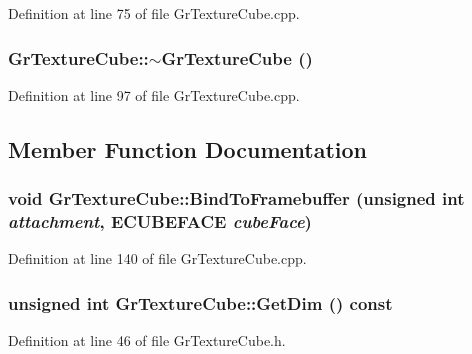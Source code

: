 \begin{CompactItemize}
Definition at line 75 of file GrTextureCube.cpp.\hypertarget{class_gr_texture_cube_db0024c06cac0f1e5cd6cbd6ba893e77}{
\subsubsection[{$\sim$GrTextureCube}]{\setlength{\rightskip}{0pt plus 5cm}GrTextureCube::$\sim$GrTextureCube ()}}
\label{class_gr_texture_cube_db0024c06cac0f1e5cd6cbd6ba893e77}




Definition at line 97 of file GrTextureCube.cpp.

\subsection{Member Function Documentation}
\hypertarget{class_gr_texture_cube_83627920cbb16d0bd7a2f9821c0125d1}{
\subsubsection[{BindToFramebuffer}]{\setlength{\rightskip}{0pt plus 5cm}void GrTextureCube::BindToFramebuffer (unsigned int {\em attachment}, \/  {\bf ECUBEFACE} {\em cubeFace})}}
\label{class_gr_texture_cube_83627920cbb16d0bd7a2f9821c0125d1}




Definition at line 140 of file GrTextureCube.cpp.\hypertarget{class_gr_texture_cube_8b80ffcf02983fb848a70e12d31c07fa}{
\subsubsection[{GetDim}]{\setlength{\rightskip}{0pt plus 5cm}unsigned int GrTextureCube::GetDim () const}}
\label{class_gr_texture_cube_8b80ffcf02983fb848a70e12d31c07fa}




Definition at line 46 of file GrTextureCube.h.\hypertarget{class_gr_texture_cube_4b60a3b45e856404c29a5a702656f9d0}{
}
\end{CompactItemize}
